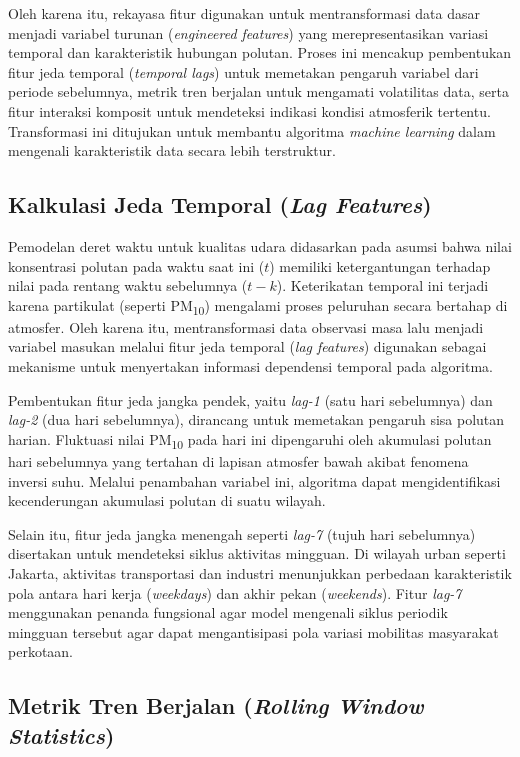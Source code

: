 Oleh karena itu, rekayasa fitur digunakan untuk mentransformasi data dasar menjadi variabel turunan (\textit{engineered features}) yang merepresentasikan variasi temporal dan karakteristik hubungan polutan. Proses ini mencakup pembentukan fitur jeda temporal (\textit{temporal lags}) untuk memetakan pengaruh variabel dari periode sebelumnya, metrik tren berjalan untuk mengamati volatilitas data, serta fitur interaksi komposit untuk mendeteksi indikasi kondisi atmosferik tertentu. Transformasi ini ditujukan untuk membantu algoritma \textit{machine learning} dalam mengenali karakteristik data secara lebih terstruktur.

\subsection{Kalkulasi Jeda Temporal (\textit{Lag Features})}

Pemodelan deret waktu untuk kualitas udara didasarkan pada asumsi bahwa nilai konsentrasi polutan pada waktu saat ini ($t$) memiliki ketergantungan terhadap nilai pada rentang waktu sebelumnya ($t-k$). Keterikatan temporal ini terjadi karena partikulat (seperti PM\textsubscript{10}) mengalami proses peluruhan secara bertahap di atmosfer. Oleh karena itu, mentransformasi data observasi masa lalu menjadi variabel masukan melalui fitur jeda temporal (\textit{lag features}) digunakan sebagai mekanisme untuk menyertakan informasi dependensi temporal pada algoritma.

Pembentukan fitur jeda jangka pendek, yaitu \textit{lag-1} (satu hari sebelumnya) dan \textit{lag-2} (dua hari sebelumnya), dirancang untuk memetakan pengaruh sisa polutan harian. Fluktuasi nilai PM\textsubscript{10} pada hari ini dipengaruhi oleh akumulasi polutan hari sebelumnya yang tertahan di lapisan atmosfer bawah akibat fenomena inversi suhu. Melalui penambahan variabel ini, algoritma dapat mengidentifikasi kecenderungan akumulasi polutan di suatu wilayah.

Selain itu, fitur jeda jangka menengah seperti \textit{lag-7} (tujuh hari sebelumnya) disertakan untuk mendeteksi siklus aktivitas mingguan. Di wilayah urban seperti Jakarta, aktivitas transportasi dan industri menunjukkan perbedaan karakteristik pola antara hari kerja (\textit{weekdays}) dan akhir pekan (\textit{weekends}). Fitur \textit{lag-7} menggunakan penanda fungsional agar model mengenali siklus periodik mingguan tersebut agar dapat mengantisipasi pola variasi mobilitas masyarakat perkotaan.

\subsection{Metrik Tren Berjalan (\textit{Rolling Window Statistics})}

